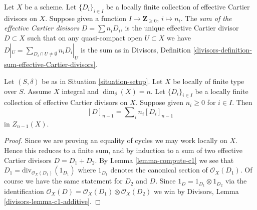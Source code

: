 \begin{definition}
\label{definition-locally-finite-sum-effective-Cartier-divisors}
Let $X$ be a scheme.
Let $\{D_i\}_{i \in I}$ be a locally finite collection
of effective Cartier divisors on $X$.
Suppose given a function
$I \to \mathbf{Z}_{\geq 0}$, $i \mapsto n_i$.
The {\it sum of the effective Cartier divisors}
$D = \sum n_i D_i$, is the unique effective Cartier divisor
$D \subset X$ such that on any quasi-compact open $U \subset X$
we have $D|_U = \sum_{D_i \cap U \not = \emptyset} n_iD_i|_U$
is the sum as in Divisors,
Definition \ref{divisors-definition-sum-effective-Cartier-divisors}.
\end{definition}

\begin{lemma}
\label{lemma-sum-divisors-associated-Weil}
Let $(S, \delta)$ be as in Situation \ref{situation-setup}.
Let $X$ be locally of finite type over $S$.
Assume $X$ integral and $\dim_\delta(X) = n$.
Let $\{D_i\}_{i \in I}$ be a locally finite collection
of effective Cartier divisors on $X$.
Suppose given $n_i \geq 0$ for $i \in I$.
Then
$$
[D]_{n - 1} = \sum\nolimits_i n_i[D_i]_{n - 1}
$$
in $Z_{n - 1}(X)$.
\end{lemma}

\begin{proof}
Since we are proving an equality of cycles we may work locally on $X$.
Hence this reduces to a finite sum, and by induction to a sum of
two effective Cartier divisors $D = D_1 + D_2$.
By Lemma \ref{lemma-compute-c1} we see that
$D_1 = \text{div}_{\mathcal{O}_X(D_1)}(1_{D_1})$ where
$1_{D_1}$ denotes the canonical section of $\mathcal{O}_X(D_1)$.
Of course we have the same statement for $D_2$ and $D$.
Since $1_D = 1_{D_1} \otimes 1_{D_2}$ via the identification
$\mathcal{O}_X(D) = \mathcal{O}_X(D_1) \otimes \mathcal{O}_X(D_2)$
we win by Divisors, Lemma \ref{divisors-lemma-c1-additive}.
\end{proof}

